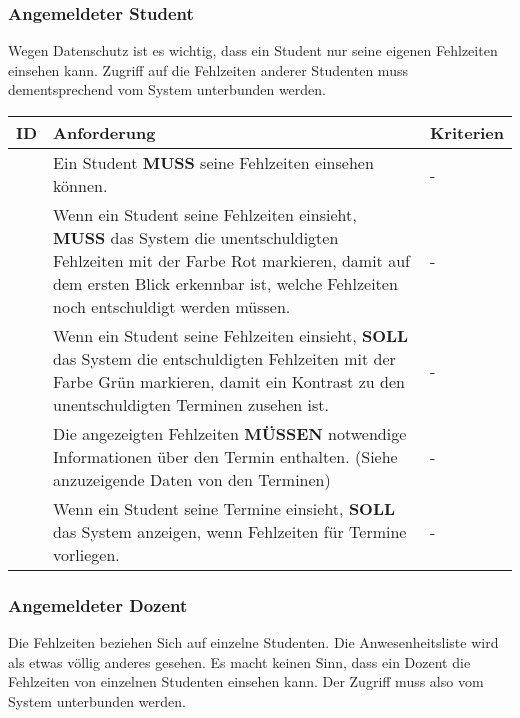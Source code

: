 \newpage

\subsubsection{Angemeldeter Student}
Wegen Datenschutz ist es wichtig, dass ein Student nur seine eigenen Fehlzeiten einsehen kann. Zugriff auf die Fehlzeiten anderer Studenten muss dementsprechend vom System unterbunden werden. 

\vspace{12pt}

\begin{tabular} {|p{}|p{}|p{}|}
	\hline
	ID & Anforderung & Kriterien \\
	\hline
	\printfreqnr
	& Ein Student \textbf{MUSS} seine Fehlzeiten einsehen können. 
	& - \\
	\hline
	\printfreqnr
	& Wenn ein Student seine Fehlzeiten einsieht, \textbf{MUSS} das System die unentschuldigten Fehlzeiten mit der Farbe Rot markieren, damit auf dem ersten Blick erkennbar ist, welche Fehlzeiten noch entschuldigt werden müssen. 
	& - \\
	\hline
	\printfreqnr
	& Wenn ein Student seine Fehlzeiten einsieht, \textbf{SOLL} das System die entschuldigten Fehlzeiten mit der Farbe Grün markieren, damit ein Kontrast zu den unentschuldigten Terminen zusehen ist. 
	& - \\
	\hline
	\printfreqnr
	& Die angezeigten Fehlzeiten \textbf{MÜSSEN} notwendige Informationen über den Termin enthalten. (Siehe anzuzeigende Daten von den Terminen)
	& - \\ 
	\hline
	\printfreqnr
	& Wenn ein Student seine Termine einsieht, \textbf{SOLL} das System anzeigen, wenn Fehlzeiten für Termine vorliegen.
	& - \\ 
	\hline
\end{tabular}

\vspace{12pt}

\subsubsection{Angemeldeter Dozent}
Die Fehlzeiten beziehen Sich auf einzelne Studenten. Die Anwesenheitsliste wird als etwas völlig anderes gesehen. Es macht keinen Sinn, dass ein Dozent die Fehlzeiten von einzelnen Studenten einsehen kann. Der Zugriff muss also vom System unterbunden werden.

\vspace{12pt}

